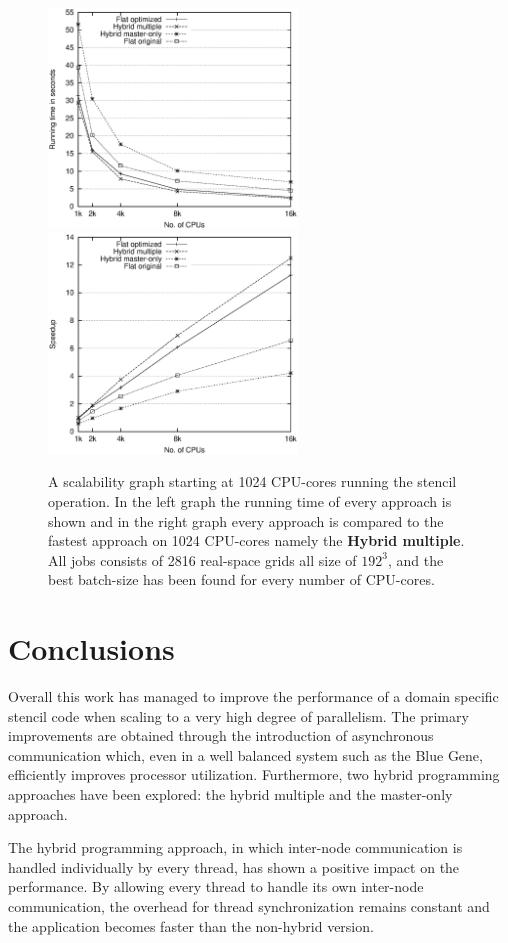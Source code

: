 \documentclass[preprint,3p,times,twocolumn]{elsarticle}
\begin{document}
\begin{figure}
\centerline{
\mbox{\includegraphics[width=250px]{gfx/fidi_scaleruntime}}
\mbox{\includegraphics[width=250px]{gfx/fidi_scale}}
} 
 \caption{A scalability graph starting at 1024 CPU-cores running the stencil operation. In the left graph the running time of every approach is shown and in the right graph every approach is compared to the fastest approach on 1024 CPU-cores namely the \textbf{Hybrid multiple}. All jobs consists of 2816 real-space grids all size of $192^3$, and the best batch-size has been found for every number of CPU-cores.}
 \label{fig:scale}
\end{figure}


\section{Conclusions}
Overall this work has managed to improve the performance of a domain specific stencil code when scaling to a very high degree of parallelism. The primary improvements are obtained through the introduction of asynchronous communication which, even in a well balanced system such as the Blue Gene, efficiently improves processor utilization. Furthermore, two hybrid programming approaches have been explored: the hybrid multiple and the master-only approach. 

The hybrid programming approach, in which inter-node communication is handled individually by every thread, has shown a positive impact on the performance. By allowing every thread to handle its own inter-node communication, the overhead for thread synchronization remains constant and the application becomes faster than the non-hybrid version.
\end{document}
